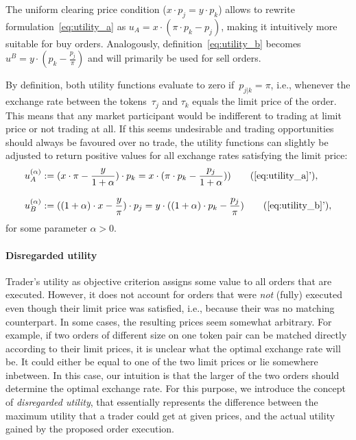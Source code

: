 \documentclass[11pt,parskip=full]{scrartcl}%
\newcommand*{\ie}{i.e., }
\begin{document}
The uniform clearing price condition ($x \cdot p_j = y \cdot p_k$) allows to rewrite formulation~\eqref{eq:utility_a} as $u_A = x \cdot (\pi \cdot p_k - p_j)$, making it intuitively more suitable for buy orders.
Analogously, definition~\eqref{eq:utility_b} becomes $u^B = y \cdot (p_k - \frac{p_j}{\pi})$ and will primarily be used for sell orders.

By definition, both utility functions evaluate to zero if~$p_{j|k} = \pi$, \ie whenever the exchange rate between the tokens~$\tau_j$ and $\tau_k$ equals the limit price of the order.
This means that any market participant would be indifferent to trading at limit price or not trading at all.
If this seems undesirable and trading opportunities should always be favoured over no trade, the utility functions can slightly be adjusted to return positive values for all exchange rates satisfying the limit price:
\begin{subequations}
\begin{align}
  u_A^{(\alpha)} &:= (x \cdot \pi - \frac{y}{1+\alpha}) \cdot p_k
  = x \cdot (\pi \cdot p_k - \frac{p_j}{1+\alpha}))
  \tag{\ref{eq:utility_a}'}\label{eq:utility_a_adjusted},\\[3mm]
  u_B^{(\alpha)} &:= ((1+\alpha) \cdot x - \frac{y}{\pi}) \cdot p_j
  = y \cdot ((1+\alpha) \cdot p_k - \frac{p_j}{\pi})
  \tag{\ref{eq:utility_b}'}\label{eq:utility_b_adjusted},
\end{align}
\label{eq:utility_adjusted}
\end{subequations}
for some parameter $\alpha > 0$.

\paragraph{Disregarded utility}

Trader's utility as objective criterion assigns some value to all orders that are executed.
However, it does not account for orders that were \emph{not} (fully) executed even though their limit price was satisfied, \ie because their was no matching counterpart.
In some cases, the resulting prices seem somewhat arbitrary.
For example, if two orders of different size on one token pair can be matched directly according to their limit prices, it is unclear what the optimal exchange rate will be.
It could either be equal to one of the two limit prices or lie somewhere inbetween.
In this case, our intuition is that the larger of the two orders should determine the optimal exchange rate.
For this purpose, we introduce the concept of \emph{disregarded utility}, that essentially represents the difference between the maximum utility that a trader could get at given prices, and the actual utility gained by the proposed order execution.
\end{document}
